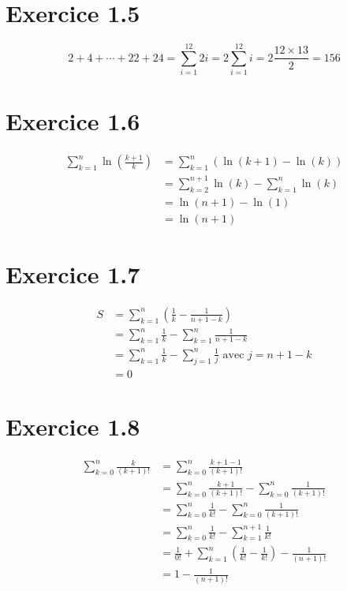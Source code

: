 \documentclass{report}
\begin{document}
\section*{Exercice 1.5}	


\[2 + 4 + \cdots + 22 + 24 = \sum_{i=1}^{12}2i 
		                   = 2\sum_{i=1}^{12}i 
		                   = 2\frac{12 \times 13}{2} 
		                   = 156 \]

\section*{Exercice 1.6}	
\begin{equation*}
	\begin{split}
		\sum_{k=1}^{n}\ln\left( \frac{k+1}{k}\right)  &= \sum_{k=1}^{n}\left( \ln(k+1)-\ln(k)\right) \\
		                                             &=  \sum_{k=2}^{n+1}\ln(k)- \sum_{k=1}^{n}\ln(k) \\
		                                             &= \ln(n+1) - \ln(1) \\
		                                             &= \ln(n+1)
	\end{split}
\end{equation*}

\section*{Exercice 1.7}	
\begin{equation*}
	\begin{split}
		S &=\sum_{k=1}^{n}\left( \frac{1}{k} - \frac{1}{n+1-k}\right) \\
		  &=\sum_{k=1}^{n} \frac{1}{k} - \sum_{k=1}^{n}\frac{1}{n+1-k} \\
		  &=\sum_{k=1}^{n} \frac{1}{k} - \sum_{j=1}^{n}\frac{1}{j} \text{ avec $j=n+1-k$}\\
		  &=0
	\end{split}
\end{equation*}

\section*{Exercice 1.8}	
\begin{equation*}
	\begin{split}
		\sum_{k=0}^{n}\frac{k}{(k+1)!} &= \sum_{k=0}^{n}\frac{k + 1 - 1}{(k+1)!} \\
		                               &= \sum_{k=0}^{n}\frac{k + 1}{(k+1)!} - \sum_{k=0}^{n}\frac{1}{(k+1)!} \\
		                               &= \sum_{k=0}^{n}\frac{1}{k!} - \sum_{k=0}^{n}\frac{1}{(k+1)!} \\
		                               &= \sum_{k=0}^{n}\frac{1}{k!} - \sum_{k=1}^{n+1}\frac{1}{k!} \\
		                               &= \frac{1}{0!} + \sum_{k=1}^{n}\left(\frac{1}{k!}-\frac{1}{k!}\right) -\frac{1}{(n+1)!} \\
		                               &= 1 -\frac{1}{(n+1)!}
	\end{split}
\end{equation*}
\end{document}
